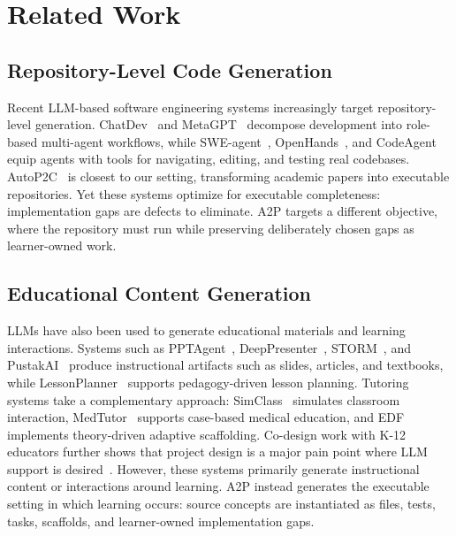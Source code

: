 \documentclass[11pt]{article}
\begin{document}
\section{Related Work}

\subsection{Repository-Level Code Generation}

Recent LLM-based software engineering systems increasingly target repository-level generation.
ChatDev~\cite{qian2023chatdev} and MetaGPT~\cite{hong2023metagpt} decompose development into role-based multi-agent workflows, while SWE-agent~\cite{yang2024sweagent}, OpenHands~\cite{wang2024openhands}, and CodeAgent~\cite{zhang2024codeagent} equip agents with tools for navigating, editing, and testing real codebases.
AutoP2C~\cite{shi2025autop2c} is closest to our setting, transforming academic papers into executable repositories.
Yet these systems optimize for executable completeness: implementation gaps are defects to eliminate.
A2P targets a different objective, where the repository must run while preserving deliberately chosen gaps as learner-owned work.

\subsection{Educational Content Generation}

LLMs have also been used to generate educational materials and learning interactions.
Systems such as PPTAgent~\cite{zheng2025pptagent}, DeepPresenter~\cite{zheng2026deeppresenter}, STORM~\cite{shao2024storm}, and PustakAI~\cite{sharma2025pustakai} produce instructional artifacts such as slides, articles, and textbooks, while LessonPlanner~\cite{wang2024lessonplanner} supports pedagogy-driven lesson planning.
Tutoring systems take a complementary approach: SimClass~\cite{zhang2024simclass} simulates classroom interaction, MedTutor~\cite{jang2026medtutor} supports case-based medical education, and EDF~\cite{cohn2026edf} implements theory-driven adaptive scaffolding.
Co-design work with K-12 educators further shows that project design is a major pain point where LLM support is desired~\cite{lee2025codesigning}.
However, these systems primarily generate instructional content or interactions around learning.
A2P instead generates the executable setting in which learning occurs: source concepts are instantiated as files, tests, tasks, scaffolds, and learner-owned implementation gaps.
\end{document}
